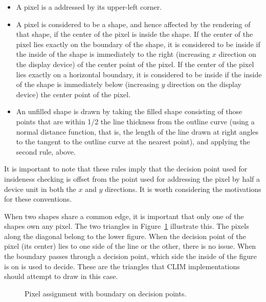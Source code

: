 \begin{itemize}
\item A pixel is a addressed by its upper-left corner.

\item A pixel is considered to be  a shape, and hence affected
by the rendering of that shape, if the center of the pixel is inside the shape.
If the center of the pixel lies exactly on the boundary of the shape, it is
considered to be inside if the inside of the shape is immediately to the right
(increasing $x$ direction on the display device) of the center point of the
pixel.  If the center of the pixel lies exactly on a horizontal boundary, it is
considered to be inside if the inside of the shape is immediately below
(increasing $y$ direction on the display device) the center point of the pixel.

\item An unfilled shape is drawn by taking the filled shape consisting of those
points that are within 1/2 the line thickness from the outline curve (using a
normal distance function, that is, the length of the line drawn at right angles
to the tangent to the outline curve at the nearest point), and applying the
second rule, above.
\end{itemize}

It is important to note that these rules imply that the decision point used for
insideness checking is offset from the point used for addressing the pixel by
half a device unit in both the $x$ and $y$ directions.  It is worth considering
the motivations for these conventions.

When two shapes share a common edge, it is important that only one of the shapes
own any pixel.  The two triangles in Figure~\ref{two-triangles} illustrate this.
The pixels along the diagonal belong to the lower figure.  When the decision
point of the pixel (its center) lies to one side of the line or the other, there
is no issue.  When the boundary passes through a decision point, which side the
inside of the figure is on is used to decide.  These are the triangles that CLIM
implementations should attempt to draw in this case.

\begin{figure}
\ifpsfig\centerline{}\else\vspace{2.25in}\fi
\caption{\label{two-triangles} Pixel assignment with boundary on decision points.}
\end{figure}

